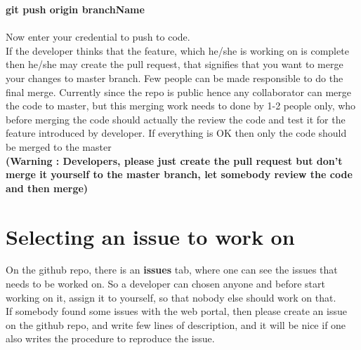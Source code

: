 \documentclass{article}
\begin{document}
   \textbf{git push origin branchName}\\ \\
   Now enter your credential to push to code. \\
   
   If the developer thinks that the feature, which he/she is working on is complete then he/she may create the pull request, that signifies that you want to merge your changes to master branch. Few people can  be made responsible to do the final merge. Currently since the repo is public hence any collaborator can merge the code to master, but this merging work needs to done by 1-2 people only, who before merging the code should actually the review the code and test it for the feature introduced by developer. If everything is OK then only the code should be merged to the master \\
   \textbf{(Warning : Developers, please just create the pull request but  don't merge it yourself to the master branch, let somebody review the code and then merge)}
   
   
   \section{Selecting an issue to work on}
   On the github repo, there is an \textbf{issues} tab, where one can see the issues that needs to be worked on.
   So a developer can chosen anyone and before start working on it, assign it to yourself, so that nobody else should work on that. \\
   If somebody found some issues with the web portal, then please create an issue on the github repo, and write few lines of description, and it will be nice if one also writes the procedure to reproduce the issue.
   
   
   
\end{document}
